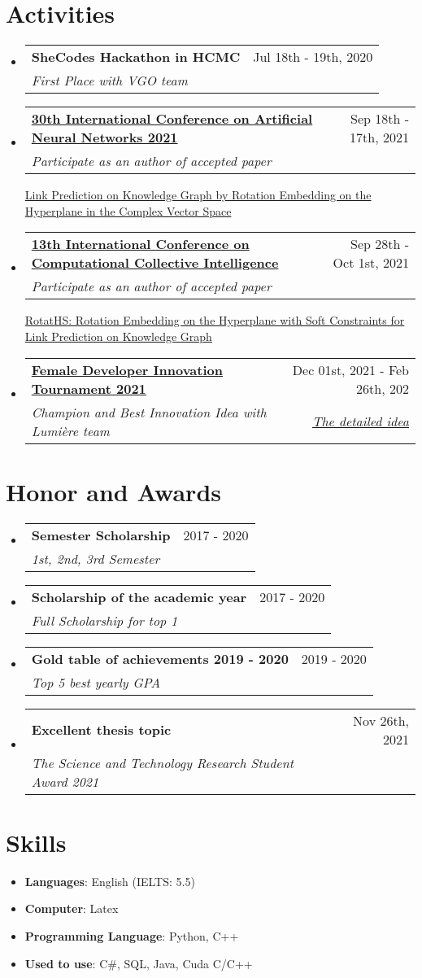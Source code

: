\documentclass[letterpaper,11pt]{article}
\makeatletter
\newcommand{\resumeItem}[2]{
  \item\small{
    \textbf{#1}{: #2 \vspace{-2pt}}
  }
}
\newcommand{\resumeSubheading}[4]{
  \vspace{-1pt}
  \item
    \begin{tabular*}{0.97\textwidth}{l@{\extracolsep{\fill}}r}
      \textbf{#1} & #2 \\
      \textit{\small#3} & \textit{\small #4} \\
    \end{tabular*}\vspace{-5pt}
}
\newcommand{\resumeSubItem}[2]{\resumeItem{#1}{#2}\vspace{-4pt}}
\newcommand{\resumeSubHeadingListStart}{\begin{itemize}[leftmargin=*]}
\newcommand{\resumeSubHeadingListEnd}{\end{itemize}}
\makeatother
\begin{document}
\section{Activities}
  \resumeSubHeadingListStart
    \resumeSubheading
      {SheCodes Hackathon in HCMC}{Jul 18th - 19th, 2020}
      {First Place with VGO team}{}
      
    \resumeSubheading
      {\href{https://e-nns.org/icann2021/}{30th International Conference on Artificial Neural Networks 2021}}{Sep 18th - 17th, 2021}
      {Participate as an author of accepted paper}{}
      
      \href{https://doi.org/10.1007/978-3-030-86365-4_14}{Link Prediction on Knowledge Graph by Rotation Embedding on the Hyperplane in the Complex Vector Space}
      
    \resumeSubheading
      {\href{https://iccci.pwr.edu.pl/2021/}{13th International Conference on Computational Collective Intelligence}}{Sep 28th - Oct 1st, 2021}
      {Participate as an author of accepted paper}{}
      
      \href{https://doi.org/10.1007/978-3-030-88081-1_3}{RotatHS: Rotation Embedding on the Hyperplane with Soft Constraints for Link Prediction on Knowledge Graph}
      
    \resumeSubheading
      {\href{https://www.fdi-tournament.com/}{Female Developer Innovation Tournament 2021}}{Dec 01st, 2021 - Feb 26th, 202}
      {Champion and Best Innovation Idea with Lumière team}{\href{https://www.linkedin.com/posts/code-like-a-girl-vietnam_fditournament-codelikeagirl-innovation-activity-6905716587299520512-lCqE}{The detailed idea}}
\resumeSubHeadingListEnd


\section{Honor and Awards}
    \resumeSubHeadingListStart
    \resumeSubheading
      {Semester Scholarship}{2017 - 2020}
      {1st, 2nd, 3rd Semester}{}
    \resumeSubheading
      {Scholarship of the academic year}{2017 - 2020}
      {Full Scholarship for top 1}{}
    \resumeSubheading
      {Gold table of achievements 2019 - 2020}{2019 - 2020}
      {Top 5 best yearly GPA}{}
    \resumeSubheading
      {Excellent thesis topic}{Nov 26th, 2021}
      {The Science and Technology Research Student Award 2021}{}
    
\resumeSubHeadingListEnd


\section{Skills}
  \resumeSubHeadingListStart
    \resumeSubItem{Languages}
      {English (IELTS: 5.5)}
    \resumeSubItem{Computer}
      {Latex}
    \resumeSubItem{Programming Language}
      {Python, C++}
    \resumeSubItem{Used to use}
      {C\#, SQL, Java, Cuda C/C++}
\resumeSubHeadingListEnd
  
\end{document}
